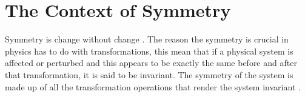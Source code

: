 \section{The Context of Symmetry}
\label{sec:chapter-2-from-symmetry}
\vspace{-10mm}
Symmetry is change without change \cite{powell2010symmetry,tapp2021symmetry}. The reason the symmetry is crucial in physics has to do with transformations, this mean that if a physical system is affected or perturbed  and this appears to be exactly the same before and after that transformation, it is said to be invariant. The symmetry of the system is made up of all the transformation operations that render the system invariant \cite{powell2010symmetry}.



